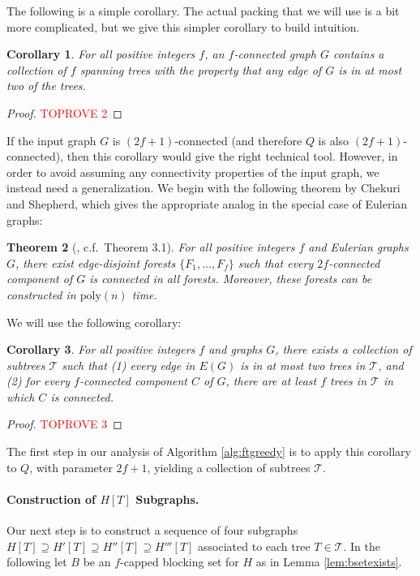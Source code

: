 \documentclass{article}
\theoremstyle{plain}
\newtheorem{theorem}{Theorem}
\newtheorem{corollary}[theorem]{Corollary}
\theoremstyle{definition}
\newcommand{\tee}{\mathcal{T}}
\begin{document}
The following is a simple corollary.  The actual packing that we will use is a bit more complicated, but we give this simpler corollary to build intuition. 

\begin{corollary} \label{cor:nwdecomp}
For all positive integers $f$, an $f$-connected graph $G$ contains a collection of $f$ spanning trees with the property that any edge of $G$ is in at most two of the trees.
\end{corollary}
\begin{proof}\textcolor{red}{TOPROVE 2}\end{proof}

If the input graph $G$ is $(2f+1)$-connected (and therefore $Q$ is also $(2f+1)$-connected), then this corollary would give the right technical tool.
However, in order to avoid assuming any connectivity properties of the input graph, we instead need a generalization.
We begin with the following theorem by Chekuri and Shepherd, which gives the appropriate analog in the special case of Eulerian graphs:
\begin{theorem} [\cite{chekuri2009approximate}, c.f.\ Theorem 3.1]\label{lem:pairwisenw}
For all positive integers $f$ and Eulerian graphs $G$, there exist edge-disjoint forests $\{F_1, \dots, F_f\}$ such that every $2f$-connected component of $G$ is connected in all forests.
Moreover, these forests can be constructed in $\text{poly}(n)$ time.
\end{theorem}

We will use the following corollary:
\begin{corollary} \label{cor:pairwisenw}
For all positive integers $f$ and graphs $G$, there exists a collection of subtrees $\tee$ such that (1) every edge in $E(G)$ is in at most two trees in $\tee$, and (2) for every $f$-connected component $C$ of $G$, there are at least $f$ trees in $\tee$ in which $C$ is connected.  
\end{corollary}
\begin{proof}\textcolor{red}{TOPROVE 3}\end{proof}

The first step in our analysis of Algorithm \ref{alg:ftgreedy} is to apply this corollary to $Q$, with parameter $2f+1$, yielding a collection of subtrees $\tee$.

\paragraph{Construction of $H[T]$ Subgraphs.} Our next step is to construct a sequence of four subgraphs $H[T] \supseteq H'[T] \supseteq H''[T] \supseteq H'''[T]$ associated to each tree $T \in \tee$.
In the following let $B$ be an $f$-capped blocking set for $H$ as in Lemma \ref{lem:bsetexists}.
\end{document}
